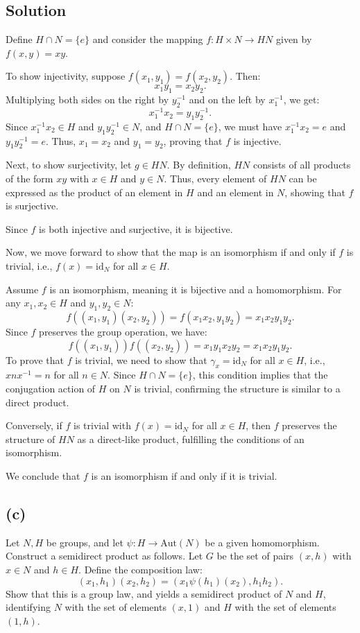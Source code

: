 \documentclass[12pt]{article}
\begin{document}
\subsection*{Solution}

Define \( H \cap N = \{e\} \) and consider the mapping \( f: H \times N \to HN \) given by \( f(x, y) = xy \).

To show injectivity, suppose \( f(x_1, y_1) = f(x_2, y_2) \). Then:
\[
x_1 y_1 = x_2 y_2.
\]
Multiplying both sides on the right by \( y_2^{-1} \) and on the left by \( x_1^{-1} \), we get:
\[
x_1^{-1} x_2 = y_1 y_2^{-1}.
\]
Since \( x_1^{-1} x_2 \in H \) and \( y_1 y_2^{-1} \in N \), and \( H \cap N = \{e\} \), we must have \( x_1^{-1} x_2 = e \) and \( y_1 y_2^{-1} = e \). Thus, \( x_1 = x_2 \) and \( y_1 = y_2 \), proving that \( f \) is injective.

Next, to show surjectivity, let \( g \in HN \). By definition, \( HN \) consists of all products of the form \( xy \) with \( x \in H \) and \( y \in N \). Thus, every element of \( HN \) can be expressed as the product of an element in \( H \) and an element in \( N \), showing that \( f \) is surjective.

Since \( f \) is both injective and surjective, it is bijective.

Now, we move forward to show that the map is an isomorphism if and only if \( f \) is trivial, i.e., \( f(x) = \text{id}_N \) for all \( x \in H \).

Assume \( f \) is an isomorphism, meaning it is bijective and a homomorphism. For any \( x_1, x_2 \in H \) and \( y_1, y_2 \in N \):
\[
f((x_1, y_1) (x_2, y_2)) = f(x_1 x_2, y_1 y_2) = x_1 x_2 y_1 y_2.
\]
Since \( f \) preserves the group operation, we have:
\[
f((x_1, y_1)) f((x_2, y_2)) = x_1 y_1 x_2 y_2 = x_1 x_2 y_1 y_2.
\]
To prove that \( f \) is trivial, we need to show that \( \gamma_x = \text{id}_N \) for all \( x \in H \), i.e., \( x n x^{-1} = n \) for all \( n \in N \). Since \( H \cap N = \{e\} \), this condition implies that the conjugation action of \( H \) on \( N \) is trivial, confirming the structure is similar to a direct product.

Conversely, if \( f \) is trivial with \( f(x) = \text{id}_N \) for all \( x \in H \), then \( f \) preserves the structure of \( HN \) as a direct-like product, fulfilling the conditions of an isomorphism.

We conclude that \( f \) is an isomorphism if and only if it is trivial.


\subsection*{(c)}
Let \( N, H \) be groups, and let \( \psi: H \to \text{Aut}(N) \) be a given homomorphism. Construct a semidirect product as follows. Let \( G \) be the set of pairs \( (x, h) \) with \( x \in N \) and \( h \in H \). Define the composition law:
\[
(x_1, h_1) (x_2, h_2) = (x_1 \psi(h_1)(x_2), h_1 h_2).
\]
Show that this is a group law, and yields a semidirect product of \( N \) and \( H \), identifying \( N \) with the set of elements \( (x, 1) \) and \( H \) with the set of elements \( (1, h) \).
\end{document}
